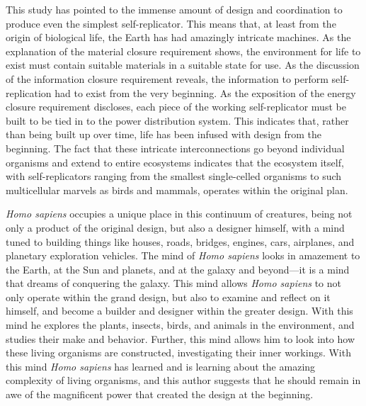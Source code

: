 This study has pointed to the immense amount of design and coordination 
to produce even the simplest self-replicator.  This means that, at least from the origin of 
biological life, the Earth has had amazingly intricate machines.  As the explanation of
the material closure requirement shows, the environment for life to exist must 
contain suitable materials in a suitable state for use.  As the discussion of the 
information closure requirement reveals, the information to perform self-replication
had to exist from the very beginning.  As the exposition of the energy closure 
requirement discloses, each piece of the working self-replicator must be built to be 
tied in to the power distribution system.  This indicates that, rather than being built up
over time, life has been infused with design from the beginning.  The fact that these
intricate interconnections go beyond individual organisms and extend to entire ecosystems
indicates that the ecosystem itself, with self-replicators ranging from the smallest
single-celled organisms to such multicellular marvels as birds and mammals, operates
within the original plan.

\textit{Homo sapiens} occupies a unique place in this continuum of creatures, being
not only a product of the original design, but also a designer himself, with a mind
tuned to building
things like houses, roads, bridges, engines, cars, airplanes, and planetary exploration
vehicles.  
The mind of \textit{Homo sapiens}
looks in amazement to the Earth, at the Sun and planets, and at the galaxy
and beyond---it is a mind that dreams of conquering the galaxy.
This mind allows \textit{Homo sapiens} to not only operate within the grand design,
but also to examine and reflect on it himself, and become a builder and designer 
within the greater design.
With this mind he explores the plants, insects, birds, and animals in
the environment, and studies their make and behavior.  Further, this mind
allows him to look
into how these living organisms are constructed, investigating their inner workings.
With this mind \textit{Homo sapiens} has learned and is learning about the amazing
complexity of living organisms, and this author suggests that he
should remain in awe of the magnificent power that created the design at the beginning.
